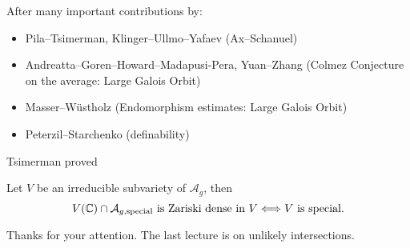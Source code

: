 \documentclass{beamer}
\begin{document}
\begin{frame}
  After many important contributions by:

  \begin{itemize}
  \item  Pila--Tsimerman, Klinger--Ullmo--Yafaev (Ax--Schanuel)
  \item   Andreatta--Goren--Howard--Madapusi-Pera, Yuan--Zhang (Colmez
    Conjecture on the average: Large Galois Orbit)
  \item Masser--Wüstholz (Endomorphism estimates: Large Galois Orbit)
  \item   Peterzil--Starchenko (definability)    
  \end{itemize}

  Tsimerman proved 
  \begin{theorem}[Tsimerman]
    Let $V$ be an irreducible subvariety of $\mathcal{A}_g$, then
    \begin{equation*}
      V({\mathbb{C}})\cap \mathcal{A}_{g,\mathrm{special}} \text{ is Zariski
        dense in $V$}\Longleftrightarrow V\text{ is special.}
    \end{equation*}
  \end{theorem}
  
\end{frame}



\begin{frame}
  \begin{center}
    Thanks for your attention. The last lecture is on unlikely
    intersections. 
  \end{center}
\end{frame}
\end{document}
